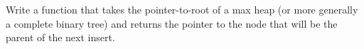   Write a function that takes the pointer-to-root of a
  max heap (or more generally a complete binary
  tree) and returns the pointer to the node that will be the parent
  of the next insert.
